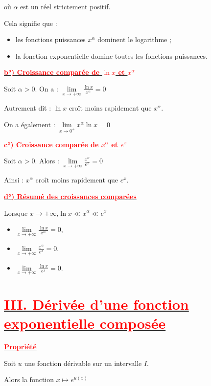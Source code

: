 \documentclass[12pt,a4paper]{article}
\begin{document}
où \(\alpha\) est un réel strictement positif.

Cela signifie que :
\begin{itemize}
    \item les fonctions puissances \(x^\alpha\) dominent le logarithme ;
    \item la fonction exponentielle domine toutes les fonctions puissances.
\end{itemize}

\underline{\textbf{\textcolor{red}{b°) Croissance comparée de \(\ln x\) et \(x^\alpha\)}}}

Soit \(\alpha>0\). On a :
\(
\boxed{
\lim\limits_{x\to+\infty}\frac{\ln x}{x^\alpha}=0
}
\)

Autrement dit :
\(
\ln x \text{ croît moins rapidement que } x^\alpha.
\)

On a également :
\(
\boxed{
\lim\limits_{x\to0^+}x^\alpha\ln x=0
}
\)

\underline{\textbf{\textcolor{red}{c°) Croissance comparée de \(x^\alpha\) et \(e^x\)}}}

Soit \(\alpha>0\). Alors :
\(
\boxed{
\lim\limits_{x\to+\infty}\frac{x^\alpha}{e^x}=0
}
\)

Ainsi :
\(
x^\alpha \text{ croît moins rapidement que } e^x.
\)

\underline{\textbf{\textcolor{red}{d°) Résumé des croissances comparées}}}

Lorsque \(x\to+\infty\),\(
\boxed{
\ln x \ll x^\alpha \ll e^x
}
\)
\begin{itemize}
\item
\(
\lim\limits_{x\to+\infty}\frac{\ln x}{x^\alpha}=0,
\)
\item
\(
\lim\limits_{x\to+\infty}\frac{x^\alpha}{e^x}=0.
\)

\item
\(
\lim\limits_{x\to+\infty}\frac{\ln x}{e^x}=0.
\)
\end{itemize}

\section*{\underline{\textbf{\textcolor{red}{III. Dérivée d'une fonction exponentielle composée}}}}

\underline{\textbf{\textcolor{red}{Propriété}}}

Soit \(u\) une fonction dérivable sur un intervalle \(I\).

Alors la fonction
\(
x\longmapsto e^{u(x)}
\)
\end{document}
